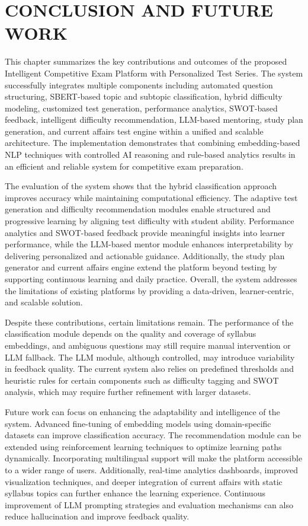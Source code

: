 \chapter{\MakeUppercase{CONCLUSION AND FUTURE WORK}}
\begin{sloppypar}

This chapter summarizes the key contributions and outcomes of the proposed Intelligent Competitive Exam Platform with Personalized Test Series. The system successfully integrates multiple components including automated question structuring, SBERT-based topic and subtopic classification, hybrid difficulty modeling, customized test generation, performance analytics, SWOT-based feedback, intelligent difficulty recommendation, LLM-based mentoring, study plan generation, and current affairs test engine within a unified and scalable architecture. The implementation demonstrates that combining embedding-based NLP techniques with controlled AI reasoning and rule-based analytics results in an efficient and reliable system for competitive exam preparation.

The evaluation of the system shows that the hybrid classification approach improves accuracy while maintaining computational efficiency. The adaptive test generation and difficulty recommendation modules enable structured and progressive learning by aligning test difficulty with student ability. Performance analytics and SWOT-based feedback provide meaningful insights into learner performance, while the LLM-based mentor module enhances interpretability by delivering personalized and actionable guidance. Additionally, the study plan generator and current affairs engine extend the platform beyond testing by supporting continuous learning and daily practice. Overall, the system addresses the limitations of existing platforms by providing a data-driven, learner-centric, and scalable solution.

Despite these contributions, certain limitations remain. The performance of the classification module depends on the quality and coverage of syllabus embeddings, and ambiguous questions may still require manual intervention or LLM fallback. The LLM module, although controlled, may introduce variability in feedback quality. The current system also relies on predefined thresholds and heuristic rules for certain components such as difficulty tagging and SWOT analysis, which may require further refinement with larger datasets.

Future work can focus on enhancing the adaptability and intelligence of the system. Advanced fine-tuning of embedding models using domain-specific datasets can improve classification accuracy. The recommendation module can be extended using reinforcement learning techniques to optimize learning paths dynamically. Incorporating multilingual support will make the platform accessible to a wider range of users. Additionally, real-time analytics dashboards, improved visualization techniques, and deeper integration of current affairs with static syllabus topics can further enhance the learning experience. Continuous improvement of LLM prompting strategies and evaluation mechanisms can also reduce hallucination and improve feedback quality.


\end{sloppypar}
